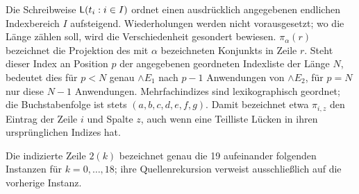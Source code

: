 Die Schreibweise \(\mathsf L(t_i:i\in I)\) ordnet einen ausdrücklich
angegebenen endlichen Indexbereich \(I\) aufsteigend. Wiederholungen
werden nicht vorausgesetzt; wo die Länge zählen soll, wird die
Verschiedenheit gesondert bewiesen. \(\pi_\alpha(r)\) bezeichnet die
Projektion des mit \(\alpha\) bezeichneten Konjunkts in Zeile \(r\).
Steht dieser Index an Position \(p\) der angegebenen geordneten
Indexliste der Länge \(N\), bedeutet dies für \(p<N\) genau
\(\land E_1\) nach \(p-1\) Anwendungen von \(\land E_2\), für
\(p=N\) nur diese \(N-1\) Anwendungen. Mehrfachindizes sind
lexikographisch geordnet; die Buchstabenfolge ist stets
\((a,b,c,d,e,f,g)\). Damit bezeichnet etwa \(\pi_{i,z}\) den
Eintrag der Zeile \(i\) und Spalte \(z\), auch wenn eine Teilliste
Lücken in ihren ursprünglichen Indizes hat.

Die indizierte Zeile \(2(k)\) bezeichnet genau die 19 aufeinander
folgenden Instanzen für \(k=0,\ldots,18\); ihre Quellenrekursion
verweist ausschließlich auf die vorherige Instanz.
\begin{tabproofwide}
\end{tabproofwide}

